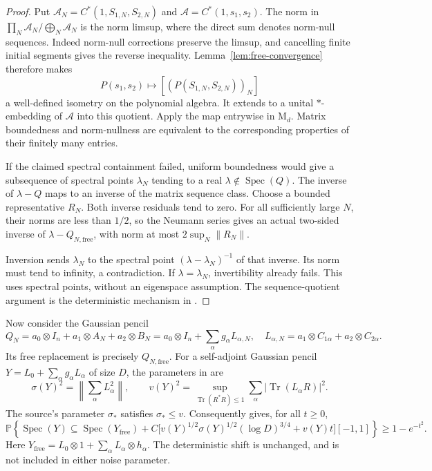 \documentclass[11pt]{article}
\DeclareMathOperator{\Tr}{Tr}
\DeclareMathOperator{\Spec}{Spec}
\newcommand{\Prob}{\mathbb P}
\newcommand{\M}{\mathrm M}
\newcommand{\norm}[1]{\left\|#1\right\|}
\begin{document}
\begin{proof}
Put $\mathcal A_N=C^*(1,S_{1,N},S_{2,N})$ and
$\mathcal A=C^*(1,s_1,s_2)$.
The norm in $\prod_N\mathcal A_N/\bigoplus_N\mathcal A_N$ is the norm
limsup, where the direct sum denotes norm-null sequences.
Indeed norm-null corrections preserve the limsup, and cancelling
finite initial segments gives the reverse inequality.
Lemma~\ref{lem:free-convergence} therefore makes
\[
 P(s_1,s_2)\longmapsto[(P(S_{1,N},S_{2,N}))_N]
\]
a well-defined isometry on the polynomial algebra. It extends to a
unital $*$-embedding of $\mathcal A$ into this quotient.
Apply the map entrywise in $\M_d$. Matrix boundedness and
norm-nullness are equivalent to the corresponding properties of
their finitely many entries.

If the claimed spectral containment failed, uniform boundedness would
give a subsequence of spectral points $\lambda_N$ tending to a real
$\lambda\notin\Spec(Q)$. The inverse of $\lambda-Q$ maps to an inverse
of the matrix sequence class. Choose a bounded representative $R_N$.
Both inverse residuals tend to zero. For all sufficiently large $N$,
their norms are less than $1/2$, so the Neumann series gives an actual
two-sided inverse of $\lambda-Q_{N,\mathrm{free}}$, with norm at most
$2\sup_N\norm{R_N}$.

Inversion sends $\lambda_N$ to the spectral point
$(\lambda-\lambda_N)^{-1}$ of that inverse. Its norm must tend to
infinity, a contradiction. If $\lambda=\lambda_N$, invertibility
already fails. This uses spectral points, without an eigenspace
assumption. The sequence-quotient argument is the deterministic
mechanism in \cite[pp.~758--760]{HT}.
\end{proof}

Now consider the Gaussian pencil
\begin{equation}\label{eq:full-pencil}
 Q_N=a_0\otimes I_n+a_1\otimes A_N+a_2\otimes B_N
     =a_0\otimes I_n+\sum_\alpha g_\alpha L_{\alpha,N},
 \quad
 L_{\alpha,N}=a_1\otimes C_{1\alpha}+a_2\otimes C_{2\alpha}.
\end{equation}
Its free replacement is precisely $Q_{N,\mathrm{free}}$.
For a self-adjoint Gaussian pencil
$Y=L_0+\sum_\alpha g_\alpha L_\alpha$ of size $D$,
the parameters in \cite[Section~2.1]{BBvH} are
\[
 \sigma(Y)^2=\norm{\sum_\alpha L_\alpha^2},\qquad
 v(Y)^2=\sup_{\Tr(R^*R)\le1}\sum_\alpha|\Tr(L_\alpha R)|^2.
\]
The source's parameter $\sigma_*$ satisfies $\sigma_*\le v$.
Consequently \cite[Theorem~2.1]{BBvH} gives, for all $t\ge0$,
\begin{equation}\label{eq:bbvh}
 \Prob\!\left\{\Spec(Y)\subseteq\Spec(Y_{\mathrm{free}})
  +C\big[v(Y)^{1/2}\sigma(Y)^{1/2}(\log D)^{3/4}
                +v(Y)t\big][-1,1]\right\}\ge1-e^{-t^2}.
\end{equation}
Here $Y_{\mathrm{free}}=L_0\otimes1+\sum_\alpha L_\alpha\otimes h_\alpha$.
The deterministic shift is unchanged, and is not included in either
noise parameter.
\end{document}
